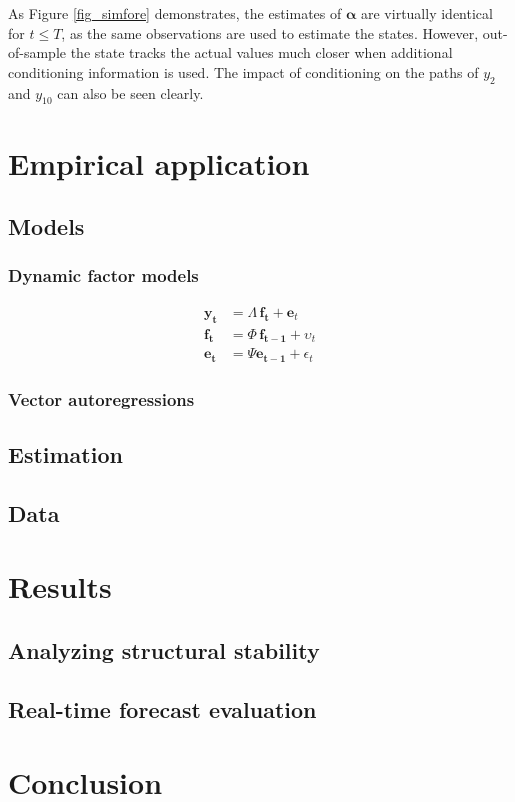 \documentclass[notitlepage,a4paper,12pt]{article}
\begin{document}
As Figure \ref{fig_simfore} demonstrates, the estimates of $\mathbf{\alpha}$ are virtually identical for $t \leq T$, as the same observations are used to estimate the states. However, out-of-sample the state tracks the actual values much closer when additional conditioning information is used. The impact of conditioning on the paths of $y_2$ and $y_{10}$ can also be seen clearly.  

\section{Empirical application}

\subsection{Models}

\subsubsection{Dynamic factor models}

\begin{subequations}
    \label{eqn:factormodel}
    \begin{align}
        \mathbf{y_t} &= \Lambda \, \mathbf{f_t} + \mathbf{e}_t \\
        \mathbf{f_t} &= \Phi \, \mathbf{f_{t-1}} + \upsilon_t \\
        \mathbf{e_t} &= \Psi \mathbf{e_{t-1}} + \epsilon_t 
    \end{align}
\end{subequations}

\subsubsection{Vector autoregressions}

\subsection{Estimation}

\subsection{Data}

\section{Results}

\subsection{Analyzing structural stability}

\subsection{Real-time forecast evaluation}

\section{Conclusion}




\end{document}
